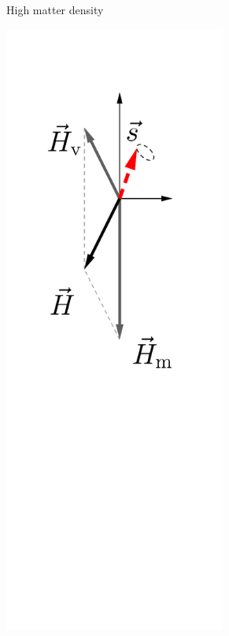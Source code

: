 \begin{figure}[htbp]
\begin{subfigure}[t]{0.3\textwidth}
		\caption{High matter density}\label{chap:basics-sec:flavor-isospin-pic-fig:msw-adiabatic-large-density}
	\end{subfigure}
	\quad
	\begin{subfigure}[t]{0.3\textwidth}
		\centering
		\includegraphics[width=0.8\textwidth]{chapters/assets/matter/matter-effect-adiabatic}

\end{subfigure}
\end{figure}
